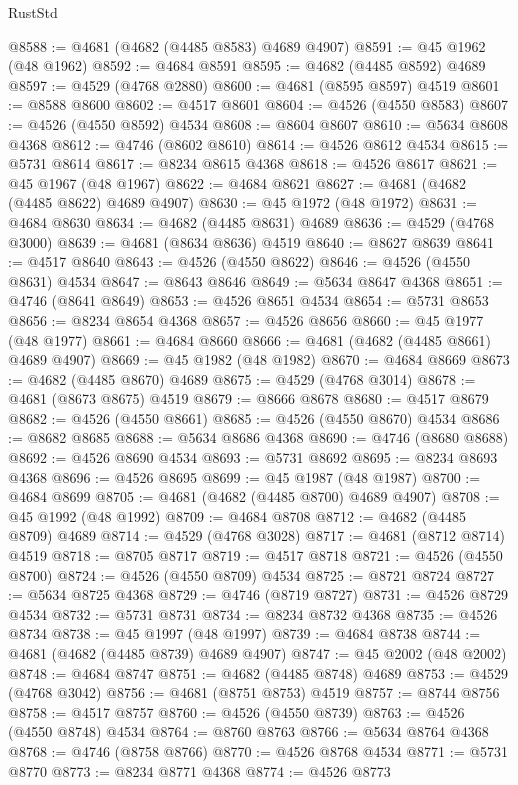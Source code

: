 \begin{lexlean}{RustStd}
\begin{coremodule}
@8588 := @4681 (@4682 (@4485 @8583) @4689 @4907)
@8591 := @45 @1962 (@48 @1962)
@8592 := @4684 @8591
@8595 := @4682 (@4485 @8592) @4689
@8597 := @4529 (@4768 @2880)
@8600 := @4681 (@8595 @8597) @4519
@8601 := @8588 @8600
@8602 := @4517 @8601
@8604 := @4526 (@4550 @8583)
@8607 := @4526 (@4550 @8592) @4534
@8608 := @8604 @8607
@8610 := @5634 @8608 @4368
@8612 := @4746 (@8602 @8610)
@8614 := @4526 @8612 @4534
@8615 := @5731 @8614
@8617 := @8234 @8615 @4368
@8618 := @4526 @8617
@8621 := @45 @1967 (@48 @1967)
@8622 := @4684 @8621
@8627 := @4681 (@4682 (@4485 @8622) @4689 @4907)
@8630 := @45 @1972 (@48 @1972)
@8631 := @4684 @8630
@8634 := @4682 (@4485 @8631) @4689
@8636 := @4529 (@4768 @3000)
@8639 := @4681 (@8634 @8636) @4519
@8640 := @8627 @8639
@8641 := @4517 @8640
@8643 := @4526 (@4550 @8622)
@8646 := @4526 (@4550 @8631) @4534
@8647 := @8643 @8646
@8649 := @5634 @8647 @4368
@8651 := @4746 (@8641 @8649)
@8653 := @4526 @8651 @4534
@8654 := @5731 @8653
@8656 := @8234 @8654 @4368
@8657 := @4526 @8656
@8660 := @45 @1977 (@48 @1977)
@8661 := @4684 @8660
@8666 := @4681 (@4682 (@4485 @8661) @4689 @4907)
@8669 := @45 @1982 (@48 @1982)
@8670 := @4684 @8669
@8673 := @4682 (@4485 @8670) @4689
@8675 := @4529 (@4768 @3014)
@8678 := @4681 (@8673 @8675) @4519
@8679 := @8666 @8678
@8680 := @4517 @8679
@8682 := @4526 (@4550 @8661)
@8685 := @4526 (@4550 @8670) @4534
@8686 := @8682 @8685
@8688 := @5634 @8686 @4368
@8690 := @4746 (@8680 @8688)
@8692 := @4526 @8690 @4534
@8693 := @5731 @8692
@8695 := @8234 @8693 @4368
@8696 := @4526 @8695
@8699 := @45 @1987 (@48 @1987)
@8700 := @4684 @8699
@8705 := @4681 (@4682 (@4485 @8700) @4689 @4907)
@8708 := @45 @1992 (@48 @1992)
@8709 := @4684 @8708
@8712 := @4682 (@4485 @8709) @4689
@8714 := @4529 (@4768 @3028)
@8717 := @4681 (@8712 @8714) @4519
@8718 := @8705 @8717
@8719 := @4517 @8718
@8721 := @4526 (@4550 @8700)
@8724 := @4526 (@4550 @8709) @4534
@8725 := @8721 @8724
@8727 := @5634 @8725 @4368
@8729 := @4746 (@8719 @8727)
@8731 := @4526 @8729 @4534
@8732 := @5731 @8731
@8734 := @8234 @8732 @4368
@8735 := @4526 @8734
@8738 := @45 @1997 (@48 @1997)
@8739 := @4684 @8738
@8744 := @4681 (@4682 (@4485 @8739) @4689 @4907)
@8747 := @45 @2002 (@48 @2002)
@8748 := @4684 @8747
@8751 := @4682 (@4485 @8748) @4689
@8753 := @4529 (@4768 @3042)
@8756 := @4681 (@8751 @8753) @4519
@8757 := @8744 @8756
@8758 := @4517 @8757
@8760 := @4526 (@4550 @8739)
@8763 := @4526 (@4550 @8748) @4534
@8764 := @8760 @8763
@8766 := @5634 @8764 @4368
@8768 := @4746 (@8758 @8766)
@8770 := @4526 @8768 @4534
@8771 := @5731 @8770
@8773 := @8234 @8771 @4368
@8774 := @4526 @8773

\end{coremodule}
\end{lexlean}
